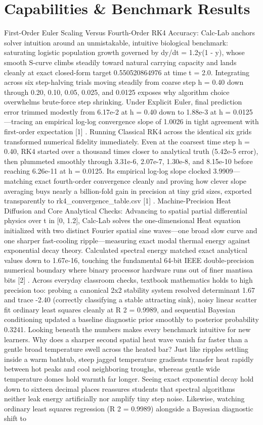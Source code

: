 \documentclass[10pt,letterpaper]{article}
\begin{document}
\section{Capabilities \& Benchmark Results}
First-Order Euler Scaling Versus Fourth-Order RK4 Accuracy: Calc-Lab anchors solver intuition around an unmistakable, intuitive biological benchmark: saturating logistic population growth governed by dy/dt = 1.2y(1 - y), whose smooth S-curve climbs steadily toward natural carrying capacity and lands cleanly at exact closed-form target 0.550520864976 at time t = 2.0. Integrating across six step-halving trials moving steadily from coarse step h = 0.40 down through 0.20, 0.10, 0.05, 0.025, and 0.0125 exposes why algorithm choice overwhelms brute-force step shrinking. Under Explicit Euler, final prediction error trimmed modestly from 6.17e-2 at h = 0.40 down to 1.88e-3 at h = 0.0125---tracing an empirical log-log convergence slope of 1.0026 in tight agreement with first-order expectation [1] . Running Classical RK4 across the identical six grids transformed numerical fidelity immediately. Even at the coarsest time step h = 0.40, RK4 started over a thousand times closer to analytical truth (5.42e-5 error), then plummeted smoothly through 3.31e-6, 2.07e-7, 1.30e-8, and 8.15e-10 before reaching 6.26e-11 at h = 0.0125. Its empirical log-log slope clocked 3.9909---matching exact fourth-order convergence cleanly and proving how clever slope averaging buys nearly a billion-fold gain in precision at tiny grid sizes, exported transparently to rk4\_convergence\_table.csv [1] . Machine-Precision Heat Diffusion and Core Analytical Checks: Advancing to spatial partial differential physics over t in [0, 1.2], Calc-Lab solves the one-dimensional Heat equation initialized with two distinct Fourier spatial sine waves---one broad slow curve and one sharper fast-cooling ripple---measuring exact modal thermal energy against exponential decay theory. Calculated spectral energy matched exact analytical values down to 1.67e-16, touching the fundamental 64-bit IEEE double-precision numerical boundary where binary processor hardware runs out of finer mantissa bits [2] . Across everyday classroom checks, textbook mathematics holds to high precision too: probing a canonical 2x2 stability system resolved determinant 1.67 and trace -2.40 (correctly classifying a stable attracting sink), noisy linear scatter fit ordinary least squares cleanly at R 2 = 0.9989, and sequential Bayesian conditioning updated a baseline diagnostic prior smoothly to posterior probability 0.3241. Looking beneath the numbers makes every benchmark intuitive for new learners. Why does a sharper second spatial heat wave vanish far faster than a gentle broad temperature swell across the heated bar? Just like ripples settling inside a warm bathtub, steep jagged temperature gradients transfer heat rapidly between hot peaks and cool neighboring troughs, whereas gentle wide temperature domes hold warmth far longer. Seeing exact exponential decay hold down to sixteen decimal places reassures students that spectral algorithms neither leak energy artificially nor amplify tiny step noise. Likewise, watching ordinary least squares regression (R 2 = 0.9989) alongside a Bayesian diagnostic shift to 
\end{document}
